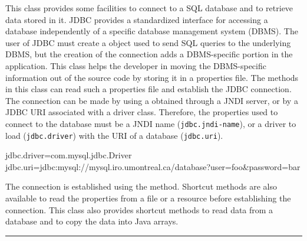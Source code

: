
This class provides some facilities to connect to a SQL database and to
retrieve data stored in it.
JDBC provides a standardized interface for accessing a database
independently of a specific database management system (DBMS).
The user of JDBC must create a  object
used to send SQL queries to the underlying DBMS, but
the creation of the connection adds a DBMS-specific portion
in the application.
This class helps the developer in moving the DBMS-specific
information out of the source code by storing it in
a properties file.  The methods in this class can
read such a properties file and establish the JDBC connection.
The connection can be made by using a  obtained
through a JNDI server, or by a JDBC URI associated with a
driver class.
Therefore, the properties used to connect to the
database must be a JNDI name (\texttt{jdbc.jndi-name}),
or a driver to load
(\texttt{jdbc.driver}) with the URI of a database (\texttt{jdbc.uri}).
\begin{vcode}

   jdbc.driver=com.mysql.jdbc.Driver\\
   jdbc.uri=jdbc:mysql://mysql.iro.umontreal.ca/database?user=foo&password=bar
\end{vcode}

The connection is established using the
method.  Shortcut methods are also available to read the
properties from a file or a resource before establishing the connection.
This class also provides shortcut methods to read data from a database
and to copy the data into Java arrays.

\bigskip\hrule

